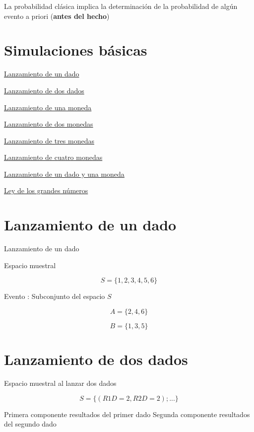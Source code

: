\documentclass[
]{book}
\theoremstyle{definition}
\theoremstyle{definition}
\theoremstyle{definition}
\theoremstyle{definition}
\theoremstyle{remark}
\begin{document}
La probabilidad clásica implica la determinación de la probabilidad de algún evento a priori (\textbf{antes del hecho})

\hypertarget{simulaciones-buxe1sicas}{%
\section{Simulaciones básicas}\label{simulaciones-buxe1sicas}}

\href{https://www.geogebra.org/m/cSfwCRkM}{Lanzamiento de un dado}

\href{https://www.geogebra.org/m/TwPXt2eD}{Lanzamiento de dos dados}

\href{https://www.geogebra.org/m/ZDNUEEwW}{Lanzamiento de una moneda}

\href{https://www.geogebra.org/m/nUZQCReV}{Lanzamiento de dos monedas}

\href{https://www.geogebra.org/m/z2cKzMwJ}{Lanzamiento de tres monedas}

\href{https://www.geogebra.org/m/pmxXRa55}{Lanzamiento de cuatro monedas}

\href{https://www.geogebra.org/m/MDXS6gVX}{Lanzamiento de un dado y una moneda}

\href{https://www.geogebra.org/m/kh2hSxsm}{Ley de los grandes números}

\hypertarget{lanzamiento-de-un-dado}{%
\section{Lanzamiento de un dado}\label{lanzamiento-de-un-dado}}

Lanzamiento de un dado

Espacio muestral

\[
S=\{1,2,3,4,5,6\}
\]

Evento : Subconjunto del espacio \(S\)

\[
A=\{2,4,6\}
\]

\[
B=\{1,3,5\}
\]

\hypertarget{lanzamiento-de-dos-dados}{%
\section{Lanzamiento de dos dados}\label{lanzamiento-de-dos-dados}}

Espacio muestral al lanzar dos dados

\[
S=\{(R1D=2,R2D=2);...\}
\]

Primera componente resultados del primer dado
Segunda componente resultados del segundo dado
\end{document}
